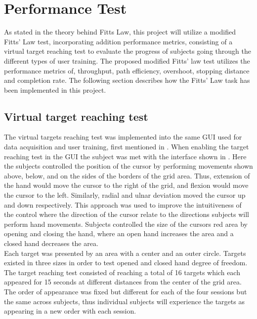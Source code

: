 \section{Performance Test} \label{sec:M:fittsLaw}



As stated in  the theory behind Fitts Law, this project will utilize a modified Fitts' Law test, incorporating addition performance metrics, consisting of a virtual target reaching test to evaluate the progress of subjects going through the different types of user training. The proposed modified Fitts' law test utilizes the performance metrics of, throughput, path efficiency, overshoot, stopping distance and completion rate. The following section describes how the Fitts' Law task has been implemented in this project.

\subsection{Virtual target reaching test} \label{sub:M:targetReachingTest}

The virtual targets reaching test was implemented into the same GUI used for data acquisition and user training, first mentioned in . 
When enabling the target reaching test in the GUI the subject was met with the interface shown in . Here the subjects controlled the position of the cursor by performing movements shown above, below, and on the sides of the borders of the grid area. Thus, extension of the hand would move the cursor to the right of the grid, and flexion would move the cursor to the left. Similarly, radial and ulnar deviation moved the cursor up and down respectively. This approach was used to improve the intuitiveness of the control where the direction of the cursor relate to the directions subjects will perform hand movements.
Subjects controlled the size of the cursors red area by opening and closing the hand, where an open hand increases the area and a closed hand decreases the area. \\
Each target was presented by an area with a center and an outer circle. Targets existed in three sizes in order to test opened and closed hand degree of freedom. The target reaching test consisted of reaching a total of 16 targets which each appeared for 15 seconds at different distances from the center of the grid area. The order of appearance was fixed but different for each of the four sessions but the same across subjects, thus individual subjects will experience the targets as appearing in a new order with each session. 

